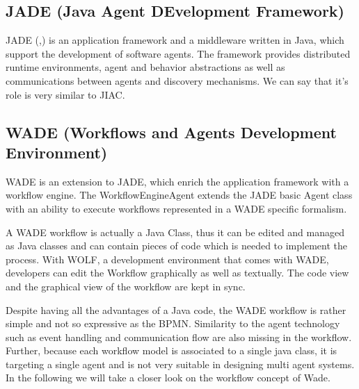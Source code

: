 \subsection{JADE (\textbf{J}ava \textbf{A}gent \textbf{DE}velopment Framework)}
JADE (\cite{FBGCAPGR08},\cite{FBAPGR99}) is an application framework and a middleware written in Java, which support the development of software agents. The framework  provides distributed runtime environments, agent and behavior abstractions as well as communications between agents and discovery mechanisms. We can say that it's role is very similar to JIAC.

\subsection{WADE (Workflows and Agents Development Environment)}
WADE is an extension to JADE, which enrich the application framework with a workflow engine. The WorkflowEngineAgent extends the JADE basic Agent class with an ability to execute workflows represented in a WADE specific formalism.

A WADE workflow is actually a Java Class, thus it can be edited and managed as Java classes and can contain pieces of code which is needed to implement the process. With WOLF, a development environment that comes with WADE, developers can edit the Workflow graphically as well as textually. The code view and the graphical view of the workflow are kept in sync.

Despite having all the advantages of a Java code, the WADE workflow is rather simple and not so expressive as the BPMN. Similarity to the agent technology such as event handling and communication flow are also missing in the workflow. Further, because each workflow model is associated to a single java class, it is targeting a single agent and is not very suitable in designing multi agent systems. In the following we will take a closer look on the workflow concept of Wade. 


